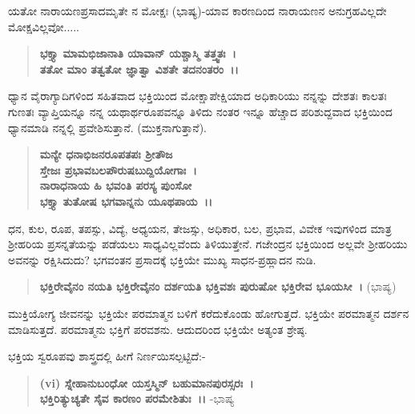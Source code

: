 ಯತೋ ನಾರಾಯಣಪ್ರಸಾದಮೃತೇ ನ ಮೋಕ್ಷಃ (ಭಾಷ್ಯ)-ಯಾವ ಕಾರಣದಿಂದ ನಾರಾಯಣನ ಅನುಗ್ರಹವಿಲ್ಲದೇ ಮೋಕ್ಷವಿಲ್ಲವೋ.....

\begin{verse}
\textbf{ಭಕ್ತ್ಯಾ ಮಾಮಭಿಜಾನಾತಿ ಯಾವಾನ್ ಯಶ್ಚಾಸ್ಮಿ ತತ್ತ್ವತಃ~।}\\\textbf{ತತೋ ಮಾಂ ತತ್ವತೋ ಜ್ಞಾತ್ವಾ ವಿಶತೇ ತದನಂತರಂ~।।}
\end{verse}

\vskip -3pt


\vskip 3pt

ಧ್ಯಾನ ವೈರಾಗ್ಯಾದಿಗಳಿಂದ ಸಹಿತವಾದ ಭಕ್ತಿಯಿಂದ ಮೋಕ್ಷಾಪೇಕ್ಷಿಯಾದ ಅಧಿಕಾರಿಯು ನನ್ನನ್ನು ದೇಶತಃ ಕಾಲತಃ ಗುಣತಃ ವ್ಯಾಪ್ತಿಯನ್ನೂ ನನ್ನ ಯಥಾರ್ಥರೂಪವನ್ನೂ ತಿಳಿದು ನಂತರ ಇನ್ನೂ ಹೆಚ್ಚಾದ ಪರಿಶುದ್ದವಾದ ಭಕ್ತಿಯಿಂದ ಧ್ಯಾನಮಾಡಿ ನನ್ನಲ್ಲಿ ಪ್ರವೇಶಿಸುತ್ತಾನೆ. (ಮುಕ್ತನಾಗುತ್ತಾನೆ).

\begin{verse}
\textbf{ಮನ್ಯೇ ಧನಾಭಿಜನರೂಪತಪಃ ಶ‍್ರೀತೌಜ\enginline{-}}\\\textbf{ಸ್ತೇಜಃ ಪ್ರಭಾವಬಲಪೌರುಷಬುದ್ದಿಯೋಗಾಃ~।}\\\textbf{ನಾರಾಧನಾಯ ಹಿ ಭವಂತಿ ಪರಸ್ಯ ಪುಂಸೋ}\\\textbf{ಭಕ್ತ್ಯಾ ತುತೋಷ ಭಗವಾನ್ನನು ಯೂಥಪಾಯ~।।}
\end{verse}

\vskip -3pt


\vskip 3pt

ಧನ, ಕುಲ, ರೂಪ, ತಪಸ್ಸು, ವಿದ್ಯೆ, ಅಧ್ಯಯನ, ತೇಜಸ್ಸು, ಅಧಿಕಾರ, ಬಲ, ಪ್ರಭಾವ, ವಿವೇಕ ಇವುಗಳಿಂದ ಮಾತ್ರ ಶ‍್ರೀಹರಿಯ ಪ್ರಸನ್ನತೆಯನ್ನು ಪಡೆಯಲು ಸಾಧ್ಯವಿಲ್ಲವೆಂದು ತಿಳಿಯುತ್ತೇನೆ. ಗಜೇಂದ್ರನ ಭಕ್ತಿಯಿಂದ ಅಲ್ಲವೇ ಶ‍್ರೀಹರಿಯು ಅವನನ್ನು ರಕ್ಷಿಸಿದುದು? ಭಗವಂತನ ಪ್ರಸಾದಕ್ಕೆ ಭಕ್ತಿಯೇ ಮುಖ್ಯ ಸಾಧನ-ಪ್ರಹ್ಲಾದನ ನುಡಿ.

\begin{verse}
\textbf{ಭಕ್ತಿರೇವೈನಂ ನಯತಿ ಭಕ್ತಿರೇವೈನಂ ದರ್ಶಯತಿ ಭಕ್ತಿವಶಃ ಪುರುಷೋ ಭಕ್ತಿರೇವ ಭೂಯಸೀ~।} (ಭಾಷ್ಯ)
\end{verse}

ಮುಕ್ತಿಯೋಗ್ಯ ಜೀವನನ್ನು ಭಕ್ತಿಯೇ ಪರಮಾತ್ಮನ ಬಳಿಗೆ ಕರೆದುಕೊಂಡು ಹೋಗುತ್ತದೆ. ಭಕ್ತಿಯೇ ಪರಮಾತ್ಮನ ದರ್ಶನ ಮಾಡಿಸುತ್ತದೆ. ಪರಮಾತ್ಮನು ಭಕ್ತಿಗೆ ಪರವಶನು. ಆದುದರಿಂದ ಭಕ್ತಿಯೇ ಅತ್ಯಂತ ಶ್ರೇಷ್ಠ.

ಭಕ್ತಿಯ ಸ್ವರೂಪವು ಶಾಸ್ತ್ರದಲ್ಲಿ ಹೀಗೆ ನಿರ್ಣಯಿಸಲ್ಪಟ್ಟಿದೆ:-

\begin{verse}
\textbf{(vi) ಸ್ನೇಹಾನುಬಂಧೋ ಯಸ್ತಸ್ಮಿನ್ ಬಹುಮಾನಪುರಸ್ಸರಃ~।}\\\textbf{ಭಕ್ತಿರಿತ್ಯುಚ್ಯತೇ ಸೈವ ಕಾರಣಂ ಪರಮೇಶಿತುಃ~।।} -ಭಾಷ್ಯ
\end{verse}

